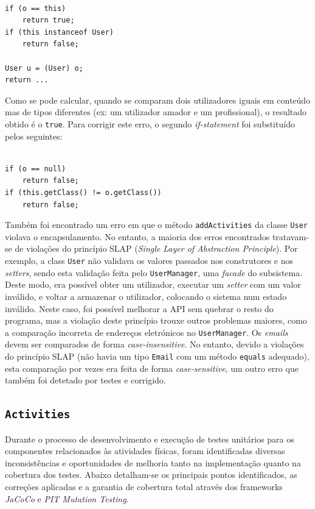 \documentclass[12pt, a4paper]{article}
\begin{document}
\begin{lstlisting}

if (o == this)
    return true;
if (this instanceof User)
    return false;

User u = (User) o;
return ...
\end{lstlisting}

Como se pode calcular, quando se comparam dois utilizadores iguais em conteúdo mas de tipos
diferentes (ex: um utilizador amador e um profissional), o resultado obtido é o \texttt{true}. Para
corrigir este erro, o segundo \emph{if-statement} foi substituído pelos seguintes:

\begin{lstlisting}

if (o == null)
    return false;
if (this.getClass() != o.getClass())
    return false;
\end{lstlisting}

Também foi encontrado um erro em que o método \texttt{addActivities} da classe \texttt{User} violava
o encapsulamento. No entanto, a maioria dos erros encontrados tratavam-se de violações do princípio
SLAP (\emph{Single Layer of Abstraction Principle}). Por exemplo, a class \texttt{User} não validava
os valores passados nos construtores e nos \emph{setters}, sendo esta validação feita pelo
\texttt{UserManager}, uma \emph{facade} do subsistema. Deste modo, era possível obter um utilizador,
executar um \emph{setter} com um valor inválido, e voltar a armazenar o utilizador, colocando o
sistema num estado inválido. Neste caso, foi possível melhorar a API sem quebrar o resto do
programa, mas a violação deste princípio trouxe outros problemas maiores, como a comparação
incorreta de endereços eletrónicos no \texttt{UserManager}. Os \emph{emails} devem ser comparados de
forma \emph{case-insensitive}. No entanto, devido a violações do princípio SLAP (não havia um tipo
\texttt{Email} com um método \texttt{equals} adequado), esta comparação por vezes era feita de forma
\emph{case-sensitive}, um outro erro que também foi detetado por testes e corrigido.

\subsection{\texttt{Activities}}

Durante o processo de desenvolvimento e execução de testes unitários para os componentes
relacionados às atividades físicas, foram identificadas diversas inconsistências e oportunidades de
melhoria tanto na implementação quanto na cobertura dos testes. Abaixo detalham-se os principais
pontos identificados, as correções aplicadas e a garantia de cobertura total através dos frameworks
\emph{JaCoCo} e \emph{PIT Mutation Testing}.
\end{document}
